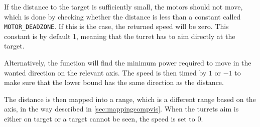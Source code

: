 If the distance to the target is sufficiently small, the motors should not move, which is done by checking whether the distance is less than a constant called \texttt{MOTOR\_DEADZONE}.
If this is the case, the returned speed will be zero.
This constant is by default 1, meaning that the turret has to aim directly at the target.

Alternatively, the function will find the minimum power required to move in the wanted direction on the relevant axis.
The speed is then timed by $1$ or $-1$ to make sure that the lower bound has the same direction as the distance.

The distance is then mapped into a range, which is a different range based on the axis, in the way described in \autoref{sec:mappingcompvis}.
When the turrets aim is either on target or a target cannot be seen, the speed is set to $0$.
